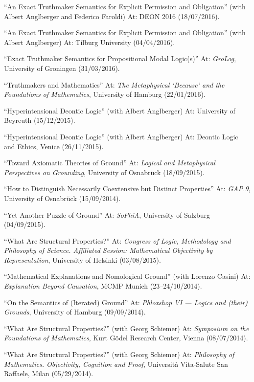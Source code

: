 \begin{etaremune}
  \item ``An Exact Truthmaker Semantics for Explicit Permission and Obligation'' (with Albert Anglberger and Federico Faroldi) At: DEON 2016 (18/07/2016).
  \item ``An Exact Truthmaker Semantics for Explicit Permission and Obligation'' (with Albert Anglberger) At: Tilburg University (04/04/2016).
  \item ``Exact Truthmaker Semantics for Propositional Modal Logic(s)'' At: \emph{GroLog}, University of Groningen (31/03/2016).
  \item ``Truthmakers and Mathematics'' At: \emph{The Metaphysical `Because' and the Foundations of Mathematics}, University of Hamburg (22/01/2016).
  \item ``Hyperintensional Deontic Logic'' (with Albert Anglberger) At: University of Beyreuth (15/12/2015).
  \item ``Hyperintensional Deontic Logic'' (with Albert Anglberger) At: Deontic Logic and Ethics, Venice (26/11/2015).
  \item ``Toward Axiomatic Theories of Ground'' At: \emph{Logical and Metaphysical Perspectives on Grounding}, University of Osnabr\"uck (18/09/2015).
  \item ``How to Distinguish Necessarily Coextensive but Distinct Properties'' At: \emph{GAP.9}, University of Osnabr\"uck (15/09/2014).
  \item ``Yet Another Puzzle of Ground'' At: \emph{SoPhiA}, University of Salzburg (04/09/2015).
  \item ``What Are Structural Properties?'' At: \emph{Congress of Logic, Methodology and Philosophy of Science. Affiliated Session: Mathematical Objectivity by Representation}, University of Helsinki (03/08/2015).
  \item ``Mathematical Explanations and Nomological Ground'' (with Lorenzo Casini) At: \emph{Explanation Beyond Causation}, MCMP Munich (23--24/10/2014).
  \item ``On the Semantics of (Iterated) Ground'' At: \emph{Phloxshop VI --- Logics and (their) Grounds}, University of Hamburg (09/09/2014).
  \item ``What Are Structural Properties?'' (with Georg Schiemer) At: \emph{Symposium on the Foundations of Mathematics}, Kurt G\"odel Research Center, Vienna (08/07/2014).
  \item ``What Are Structural Properties?'' (with Georg Schiemer) At: \emph{Philosophy of Mathematics. Objectivity, Cognition and Proof}, Universit\`a Vita-Salute San Raffaele, Milan (05/29/2014).

\end{etaremune}
